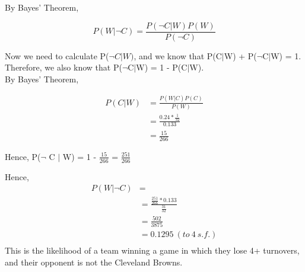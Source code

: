 \documentclass{article}
\newcommand\ddfrac[2]{\frac{\displaystyle #1}{\displaystyle #2}}
\begin{document}
By Bayes' Theorem, 

$$P(W|\lnot C) = \ddfrac{P(\lnot C|W)P(W)}{P(\lnot C)}$$

Now we need to calculate P($\lnot C|W)$, and we know that P(C$|$W) + P($\lnot$C$|$W) = 1. Therefore, we also know that P($\lnot$C$|$W) = 1 - P(C$|$W). \\

By Bayes' Theorem,

\begin{align*}
P(C|W) &= \ddfrac{P(W|C)P(C)}{P(W)} \\
       &= \ddfrac{0.24 * \ddfrac{1}{32}}{0.133} \\
       &= \ddfrac{15}{266}
\end{align*}

Hence, P($\lnot$ C $|$ W) = 1 - $\ddfrac{15}{266}$ = $\ddfrac{251}{266}$

Hence, 
\begin{align*}
P(W|\lnot C) &=  \\
		       &= \ddfrac{\ddfrac{251}{266} * 0.133}{\ddfrac{31}{32}} \\       
		       &= \ddfrac{502}{3875}  \\       
		       &= 0.1295\ (to\ 4\ s.f.) \\
\end{align*}
This is the likelihood of a team winning a game in which they lose 4+ turnovers, and their opponent is not the Cleveland Browns.
\end{document}
